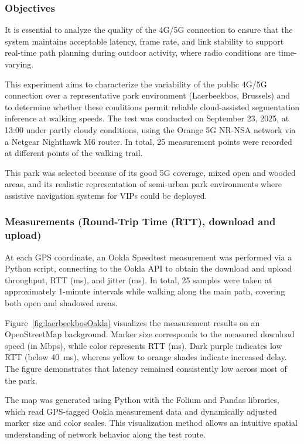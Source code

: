 \documentclass{ieeeaccess}
\begin{document}
\subsubsection{Objectives}
It is essential to analyze the quality of the 4G/5G connection to ensure that the system maintains acceptable latency, frame rate, and link stability to support real-time path planning during outdoor activity, where radio conditions are time-varying.  

This experiment aims to characterize the variability of the public 4G/5G connection over a representative park environment (Laerbeekbos, Brussels) and to determine whether these conditions permit reliable cloud-assisted segmentation inference at walking speeds. The test was conducted on September 23, 2025, at 13:00 under partly cloudy conditions, using the Orange 5G NR-NSA network via a Netgear Nighthawk M6 router. In total, 25 measurement points were recorded at different points of the walking trail.  

This park was selected because of its good 5G coverage, mixed open and wooded areas, and its realistic representation of semi-urban park environments where assistive navigation systems for VIPs could be deployed.

\subsubsection{Measurements (Round-Trip Time (RTT), download and upload)}
At each GPS coordinate, an Ookla Speedtest measurement was performed via a Python script, connecting to the Ookla API to obtain the download and upload throughput, RTT (ms), and jitter (ms).
In total, 25 samples were taken at approximately 1-minute intervals while walking along the main path, covering both open and shadowed areas.

Figure~\ref{fig:laerbeekbosOakla} visualizes the measurement results on an OpenStreetMap background.  
Marker size corresponds to the measured download speed (in Mbps), while color represents RTT (ms). Dark purple indicates low RTT (below 40~ms), whereas yellow to orange shades indicate increased delay.  
The figure demonstrates that latency remained consistently low across most of the park.  

The map was generated using Python with the Folium and Pandas libraries, which read GPS-tagged Ookla measurement data and dynamically adjusted marker size and color scales. This visualization method allows an intuitive spatial understanding of network behavior along the test route.
\end{document}
